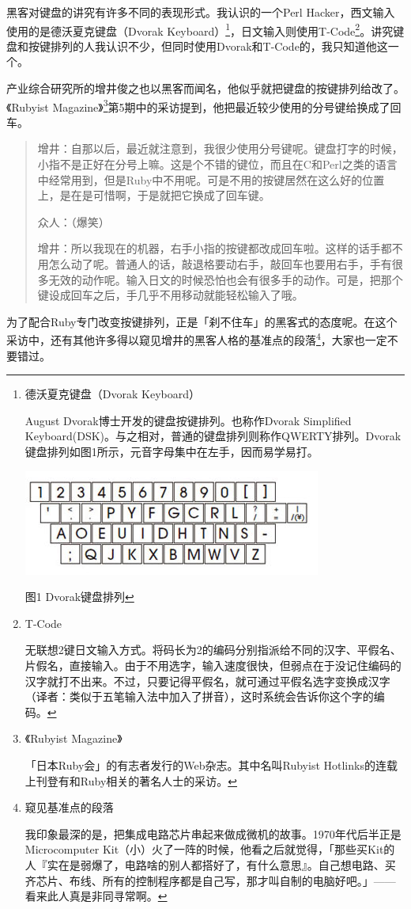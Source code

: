 \documentclass[a4paper,12pt]{article}
\begin{document}
黑客对键盘的讲究有许多不同的表现形式。我认识的一个Perl Hacker，西文输入使用的是德沃夏克键盘（Dvorak Keyboard）\footnote{德沃夏克键盘（Dvorak Keyboard）

August Dvorak博士开发的键盘按键排列。也称作Dvorak Simplified Keyboard(DSK)。与之相对，普通的键盘排列则称作QWERTY排列。Dvorak键盘排列如图1所示，元音字母集中在左手，因而易学易打。

%
\includegraphics[scale=0.5]{hlfig1.jpg}

图1 Dvorak键盘排列
}，日文输入则使用T-Code\footnote{T-Code

无联想2键日文输入方式。将码长为2的编码分别指派给不同的汉字、平假名、片假名，直接输入。由于不用选字，输入速度很快，但弱点在于没记住编码的汉字就打不出来。不过，只要记得平假名，就可通过平假名选字变换成汉字（译者：类似于五笔输入法中加入了拼音），这时系统会告诉你这个字的编码。}。讲究键盘和按键排列的人我认识不少，但同时使用Dvorak和T-Code的，我只知道他这一个。

产业综合研究所的增井俊之也以黑客而闻名，他似乎就把键盘的按键排列给改了。《Rubyist Magazine》\footnote{《Rubyist Magazine》

「日本Ruby会」的有志者发行的Web杂志。其中名叫Rubyist Hotlinks的连载上刊登有和Ruby相关的著名人士的采访。}第5期中的采访提到，他把最近较少使用的分号键给换成了回车。
\begin{quote}
增井：自那以后，最近就注意到，我很少使用分号键呢。键盘打字的时候，小指不是正好在分号上嘛。这是个不错的键位，而且在C和Perl之类的语言中经常用到，但是Ruby中不用呢。可是不用的按键居然在这么好的位置上，是在是可惜啊，于是就把它换成了回车键。

众人：（爆笑）

增井：所以我现在的机器，右手小指的按键都改成回车啦。这样的话手都不用怎么动了呢。普通人的话，敲退格要动右手，敲回车也要用右手，手有很多无效的动作呢。输入日文的时候恐怕也会有很多手的动作。可是，把那个键设成回车之后，手几乎不用移动就能轻松输入了哦。
\end{quote}
为了配合Ruby专门改变按键排列，正是「刹不住车」的黑客式的态度呢。在这个采访中，还有其他许多得以窥见增井的黑客人格的基准点的段落\footnote{窥见基准点的段落

我印象最深的是，把集成电路芯片串起来做成微机的故事。1970年代后半正是Microcomputer Kit（小）火了一阵的时候，他看之后就觉得，「那些买Kit的人『实在是弱爆了，电路啥的别人都搭好了，有什么意思』。自己想电路、买齐芯片、布线、所有的控制程序都是自己写，那才叫自制的电脑好吧。」——看来此人真是非同寻常啊。}，大家也一定不要错过。
\end{document}

